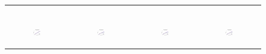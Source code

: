 \begin{figure}[ht]
\begin{tabular}{cccc}
\begin{subfigure}[b]{0.22\textwidth}
			\caption{}
			\label{appfig:partition:runtime_it2004_setcover}
	  \end{subfigure} \\
	  \begin{subfigure}[b]{0.22\textwidth}
	  	\includegraphics[width=110pt]{images_partition/speedup_friendster_setcover.pdf}
			\caption{}
			\label{appfig:partition:speedup_friendster_setcover}
	  \end{subfigure} &
	  \begin{subfigure}[b]{0.22\textwidth}
	  	\includegraphics[width=110pt]{images_partition/speedup_arabic2005_setcover.pdf}
			\caption{}
			\label{appfig:partition:speedup_arabic2005_setcover}
	  \end{subfigure} &
	  \begin{subfigure}[b]{0.22\textwidth}
	  	\includegraphics[width=110pt]{images_partition/speedup_uk2005_setcover.pdf}
			\caption{}
			\label{appfig:partition:speedup_uk2005_setcover}
	  \end{subfigure} &
	  \begin{subfigure}[b]{0.22\textwidth}
	  	\includegraphics[width=110pt]{images_partition/speedup_it2004_setcover.pdf}

\end{subfigure}
\end{tabular}
\end{figure}
